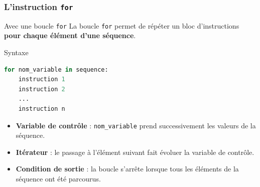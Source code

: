 \documentclass[10pt]{beamer}
\begin{document}
\begin{frame}[containsverbatim]
	\frametitle{L'instruction \texttt{for}}
	\begin{block}{Avec une boucle \texttt{for}}
		La boucle \texttt{for} permet de répéter un bloc d'instructions
		\textbf{pour chaque élément d'une séquence}.
	\end{block}
	
	\vspace{0.15cm}
	
\begin{alertblock}{Syntaxe}
\begin{lstlisting}[language=Python]
for nom_variable in sequence:
	instruction 1
	instruction 2
	...
	instruction n
\end{lstlisting}
\end{alertblock}
	
	\vspace{0.1cm}
	
	\begin{itemize}
		\item \textbf{Variable de contrôle} : \texttt{nom\_variable} prend successivement
		les valeurs de la séquence.
		
		\item \textbf{Itérateur} : le passage à l'élément suivant fait évoluer
		la variable de contrôle.
		
		\item \textbf{Condition de sortie} : la boucle s'arrête lorsque tous les
		éléments de la séquence ont été parcourus.
	\end{itemize}

	
\end{frame}
\end{document}
